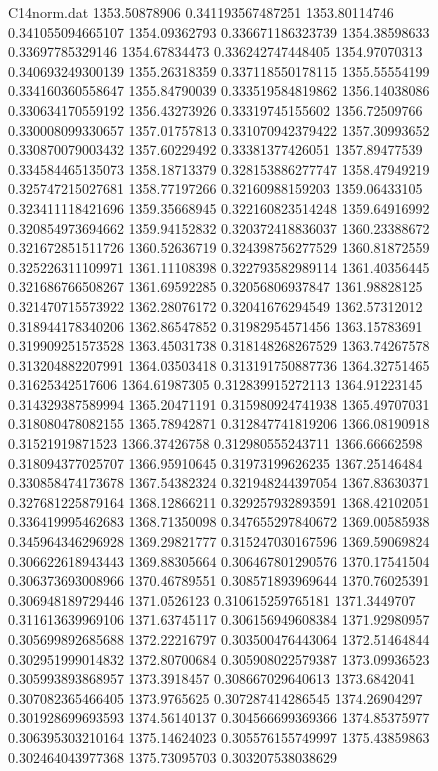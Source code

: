 \begin{filecontents}{C14norm.dat}
1353.50878906			0.341193567487251
1353.80114746			0.341055094665107
1354.09362793			0.336671186323739
1354.38598633			0.33697785329146
1354.67834473			0.336242747448405
1354.97070313			0.340693249300139
1355.26318359			0.337118550178115
1355.55554199			0.334160360558647
1355.84790039			0.333519584819862
1356.14038086			0.330634170559192
1356.43273926			0.33319745155602
1356.72509766			0.330008099330657
1357.01757813			0.331070942379422
1357.30993652			0.330870079003432
1357.60229492			0.33381377426051
1357.89477539			0.334584465135073
1358.18713379			0.328153886277747
1358.47949219			0.325747215027681
1358.77197266			0.32160988159203
1359.06433105			0.323411118421696
1359.35668945			0.322160823514248
1359.64916992			0.320854973694662
1359.94152832			0.320372418836037
1360.23388672			0.321672851511726
1360.52636719			0.324398756277529
1360.81872559			0.325226311109971
1361.11108398			0.322793582989114
1361.40356445			0.321686766508267
1361.69592285			0.32056806937847
1361.98828125			0.321470715573922
1362.28076172			0.32041676294549
1362.57312012			0.318944178340206
1362.86547852			0.31982954571456
1363.15783691			0.319909251573528
1363.45031738			0.318148268267529
1363.74267578			0.313204882207991
1364.03503418			0.313191750887736
1364.32751465			0.31625342517606
1364.61987305			0.312839915272113
1364.91223145			0.314329387589994
1365.20471191			0.315980924741938
1365.49707031			0.318080478082155
1365.78942871			0.312847741819206
1366.08190918			0.31521919871523
1366.37426758			0.312980555243711
1366.66662598			0.318094377025707
1366.95910645			0.31973199626235
1367.25146484			0.330858474173678
1367.54382324			0.321948244397054
1367.83630371			0.327681225879164
1368.12866211			0.329257932893591
1368.42102051			0.336419995462683
1368.71350098			0.347655297840672
1369.00585938			0.345964346296928
1369.29821777			0.315247030167596
1369.59069824			0.306622618943443
1369.88305664			0.306467801290576
1370.17541504			0.306373693008966
1370.46789551			0.308571893969644
1370.76025391			0.306948189729446
1371.0526123			0.310615259765181
1371.3449707			0.311613639969106
1371.63745117			0.306156949608384
1371.92980957			0.305699892685688
1372.22216797			0.303500476443064
1372.51464844			0.302951999014832
1372.80700684			0.305908022579387
1373.09936523			0.305993893868957
1373.3918457			0.308667029640613
1373.6842041			0.307082365466405
1373.9765625			0.307287414286545
1374.26904297			0.301928699693593
1374.56140137			0.304566699369366
1374.85375977			0.306395303210164
1375.14624023			0.305576155749997
1375.43859863			0.302464043977368
1375.73095703			0.303207538038629

\end{filecontents}
